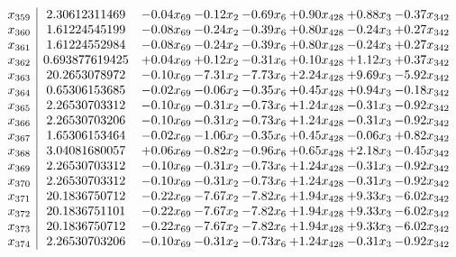 \documentclass[8pt]{article}
\begin{document}
\[\begin{array}{c| c c@{\hskip 2pt} c@{\hskip 2pt} c@{\hskip 2pt} c@{\hskip 2pt} c@{\hskip 2pt} c@{\hskip 2pt} }
 x_{359}   &  2.30612311469 & -0.04 x_{69} & -0.12 x_{2} & -0.69 x_{6} & +  0.90 x_{428} & +  0.88 x_{3} & -0.37 x_{342}\\
 x_{360}   &  1.61224545199 & -0.08 x_{69} & -0.24 x_{2} & -0.39 x_{6} & +  0.80 x_{428} & -0.24 x_{3} & +  0.27 x_{342}\\
 x_{361}   &  1.61224552984 & -0.08 x_{69} & -0.24 x_{2} & -0.39 x_{6} & +  0.80 x_{428} & -0.24 x_{3} & +  0.27 x_{342}\\
 x_{362}   &  0.693877619425 & +  0.04 x_{69} & +  0.12 x_{2} & -0.31 x_{6} & +  0.10 x_{428} & +  1.12 x_{3} & +  0.37 x_{342}\\
 x_{363}   &  20.2653078972 & -0.10 x_{69} & -7.31 x_{2} & -7.73 x_{6} & +  2.24 x_{428} & +  9.69 x_{3} & -5.92 x_{342}\\
 x_{364}   &  0.65306153685 & -0.02 x_{69} & -0.06 x_{2} & -0.35 x_{6} & +  0.45 x_{428} & +  0.94 x_{3} & -0.18 x_{342}\\
 x_{365}   &  2.26530703312 & -0.10 x_{69} & -0.31 x_{2} & -0.73 x_{6} & +  1.24 x_{428} & -0.31 x_{3} & -0.92 x_{342}\\
 x_{366}   &  2.26530703206 & -0.10 x_{69} & -0.31 x_{2} & -0.73 x_{6} & +  1.24 x_{428} & -0.31 x_{3} & -0.92 x_{342}\\
 x_{367}   &  1.65306153464 & -0.02 x_{69} & -1.06 x_{2} & -0.35 x_{6} & +  0.45 x_{428} & -0.06 x_{3} & +  0.82 x_{342}\\
 x_{368}   &  3.04081680057 & +  0.06 x_{69} & -0.82 x_{2} & -0.96 x_{6} & +  0.65 x_{428} & +  2.18 x_{3} & -0.45 x_{342}\\
 x_{369}   &  2.26530703312 & -0.10 x_{69} & -0.31 x_{2} & -0.73 x_{6} & +  1.24 x_{428} & -0.31 x_{3} & -0.92 x_{342}\\
 x_{370}   &  2.26530703312 & -0.10 x_{69} & -0.31 x_{2} & -0.73 x_{6} & +  1.24 x_{428} & -0.31 x_{3} & -0.92 x_{342}\\
 x_{371}   &  20.1836750712 & -0.22 x_{69} & -7.67 x_{2} & -7.82 x_{6} & +  1.94 x_{428} & +  9.33 x_{3} & -6.02 x_{342}\\
 x_{372}   &  20.1836751101 & -0.22 x_{69} & -7.67 x_{2} & -7.82 x_{6} & +  1.94 x_{428} & +  9.33 x_{3} & -6.02 x_{342}\\
 x_{373}   &  20.1836750712 & -0.22 x_{69} & -7.67 x_{2} & -7.82 x_{6} & +  1.94 x_{428} & +  9.33 x_{3} & -6.02 x_{342}\\
 x_{374}   &  2.26530703206 & -0.10 x_{69} & -0.31 x_{2} & -0.73 x_{6} & +  1.24 x_{428} & -0.31 x_{3} & -0.92 x_{342}\\

\end{array}\]
\end{document}
